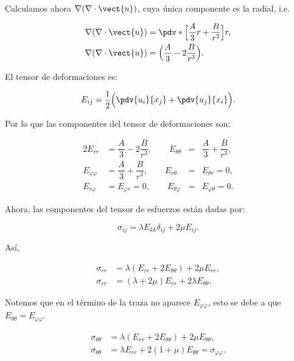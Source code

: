 \documentclass[../main.tex]{subfiles}
\begin{document}
\begin{problema}[4]
	Calculamos ahora \(\nabla{(\nabla \cdot{\vect{u}})}\), cuya única componente es
	la radial, i.e.

	\begin{align*}
		\nabla{(\nabla \cdot{\vect{u}})} & = \pdv*{\Bigl[\dfrac{A}{3}r + \dfrac{B}{r^{2}}\Bigr]}{r}, \\
		\nabla{(\nabla \cdot{\vect{u}})} & = \Bigl(\dfrac{A}{3} - 2\dfrac{B}{r^{3}}\Bigr).
	\end{align*}

	El tensor de deformaciones es:

	\begin{equation*}
		E_{ij} = \dfrac{1}{2}\Bigl(\pdv{u_{i}}{x_{j}} + \pdv{u_{j}}{x_{i}}\Bigr).
	\end{equation*}

	Por lo que las componentes del tensor de deformaciones son:

	\begin{alignat*}{2}
		E_{rr}             & = \dfrac{A}{3} -2\dfrac{B}{r^{3}},\qquad E_{\theta\theta} & {}={} & \dfrac{A}{3} + \dfrac{B}{r^{3}}, \\
		E_{\varphi\varphi} & = \dfrac{A}{3} + \dfrac{B}{r^{3}},\qquad E_{r\theta}      & {}={} & E_{\theta r} = 0,                \\
		E_{r\varphi}       & = E_{\varphi r} = 0,\qquad E_{\theta\varphi}              & {}={} & E_{\varphi\theta} = 0.
	\end{alignat*}

	Ahora, las componentes del tensor de esfuerzos están dadas por:

	\begin{equation*}
		\sigma_{ij} = \lambda E_{kk}\delta_{ij} + 2\mu E_{ij}.
	\end{equation*}

	Así,

	\begin{align}
		\sigma_{rr} & = \lambda(E_{rr} + 2E_{\theta\theta}) + 2\mu E_{rr},\nonumber            \\
		\sigma_{rr} & = (\lambda + 2\mu)E_{rr} + 2\lambda E_{\theta\theta}.\label{eq:sigma_rr}
	\end{align}

	Notemos que en el término de la traza no aparece \(E_{\varphi\varphi}\), esto se debe a
	que \( E_{\theta\theta} = E_{\varphi\varphi}\).

	\begin{align}
		\sigma_{\theta\theta} & = \lambda(E_{rr} + 2E_{\theta\theta}) + 2\mu E_{\theta\theta},\nonumber                     \\
		\sigma_{\theta\theta} & = \lambda E_{rr} + 2(1 + \mu)E_{\theta\theta} = \sigma_{\varphi\varphi}.\label{eq:sigma_ff}
	\end{align}


\end{problema}
\end{document}
